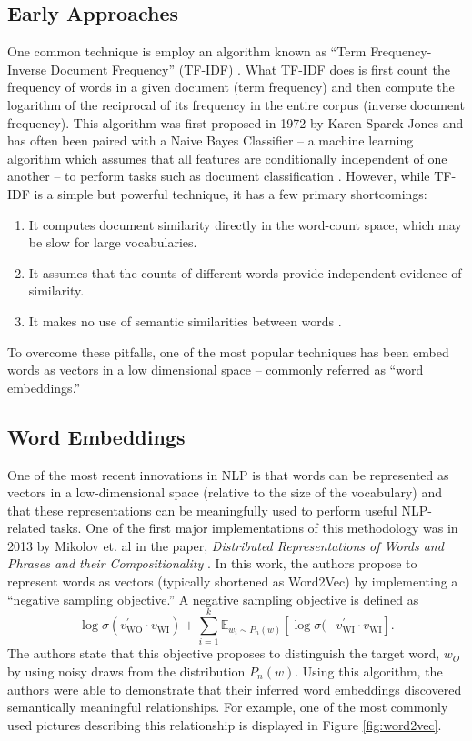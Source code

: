 \documentclass[../thesis.tex]{subfiles}
\begin{document}
\subsection{Early Approaches}
One common technique is employ an algorithm known as ``Term Frequency-Inverse Document Frequency'' (TF-IDF) \cite{sparck1972statistical}. What TF-IDF does is first count the frequency of words in a given document (term frequency) and then compute the logarithm of the reciprocal of its frequency in the entire corpus (inverse document frequency). This algorithm was first proposed in 1972 by Karen Sparck Jones and has often been paired with a Naive Bayes Classifier -- a machine learning algorithm which assumes that all features are conditionally independent of one another -- to perform tasks such as document classification \cite{kibriya2004multinomial}. However, while TF-IDF is a simple but powerful technique, it has a few primary shortcomings:
\begin{enumerate}
    \item It computes document similarity directly in the word-count space, which may be slow for large vocabularies.
    \item It assumes that the counts of different words provide independent evidence of similarity.
    \item It makes no use of semantic similarities between words \cite{tfidf_lecture}.
\end{enumerate}
To overcome these pitfalls, one of the most popular techniques has been embed words as vectors in a low dimensional space -- commonly referred as ``word embeddings.''

\subsection{Word Embeddings}
One of the most recent innovations in NLP is that words can be represented as vectors in a low-dimensional space (relative to the size of the vocabulary) and that these representations can be meaningfully used to perform useful NLP-related tasks. One of the first major implementations of this methodology was in 2013 by Mikolov et. al in the paper, \textit{Distributed Representations of Words and Phrases
and their Compositionality} \cite{mikolov2013distributed}. In this work, the authors propose to represent words as vectors (typically shortened as Word2Vec) by implementing a ``negative sampling objective.'' A negative sampling objective is defined as
\begin{equation}
    \log \sigma\left(v_{\text{WO}}^\prime \cdot v_{\text{WI}}\right) + \sum_{i=1}^k \mathbb{E}_{w_i \sim P_n(w)} \left[\log \sigma(-v_{\text{WI}}^\prime \cdot v_{\text{WI}}\right].
\end{equation}
The authors state that this objective proposes to distinguish the target word, $w_O$ by using noisy draws from the distribution $P_n(w)$. Using this algorithm, the authors were able to demonstrate that their inferred word embeddings discovered semantically meaningful relationships. For example, one of the most commonly used pictures describing this relationship is displayed in Figure \ref{fig:word2vec}.
\end{document}
